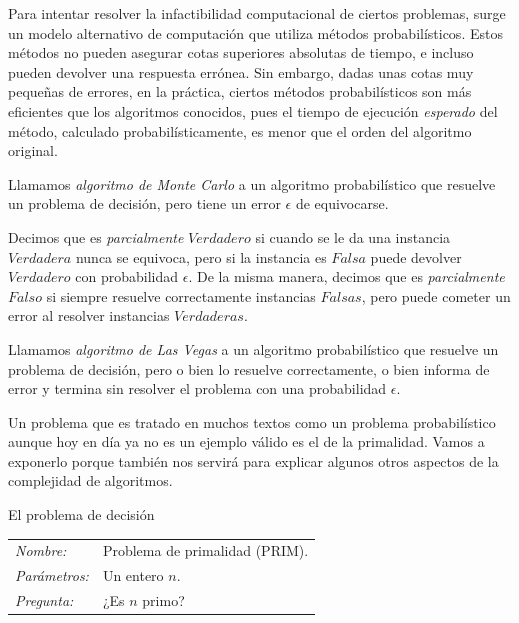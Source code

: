 Para intentar resolver la infactibilidad computacional de ciertos problemas, surge un modelo alternativo de computación que utiliza métodos probabilísticos. Estos métodos no pueden asegurar cotas superiores absolutas de tiempo, e incluso pueden devolver una respuesta errónea. Sin embargo, dadas unas cotas muy pequeñas de errores, en la práctica, ciertos métodos probabilísticos son más eficientes que los algoritmos conocidos, pues el tiempo de ejecución \textit{esperado} del método, calculado probabilísticamente, es menor que el orden del algoritmo original.



\begin{definition}
	Llamamos \textit{algoritmo de Monte Carlo} a un algoritmo probabilístico que resuelve un problema de decisión, pero tiene un error $\epsilon$ de equivocarse.

	Decimos que es \textit{parcialmente} $Verdadero$ si cuando se le da una instancia $Verdadera$ nunca se equivoca, pero si la instancia es $Falsa$ puede devolver $Verdadero$ con probabilidad $\epsilon$. De la misma manera, decimos que es \textit{parcialmente} $Falso$ si siempre resuelve correctamente instancias $Falsas$, pero puede cometer un error al resolver instancias $Verdaderas$.
\end{definition}


\begin{definition}
	Llamamos \textit{algoritmo de Las Vegas} a un algoritmo probabilístico que resuelve un problema de decisión, pero o bien lo resuelve correctamente, o bien informa de error y termina sin resolver el problema con una probabilidad $\epsilon$.
\end{definition}

Un problema que es tratado en muchos textos como un problema probabil\'istico aunque hoy en d\'ia ya no es un ejemplo v\'alido es el de la primalidad. Vamos a exponerlo porque tambi\'en nos servir\'a para explicar algunos otros aspectos de la complejidad de algoritmos.

\begin{example}
	El problema de decisión

	\begin{tabular}{|ll}
		\textit{Nombre:} & Problema de primalidad (PRIM). \\
		\textit{Parámetros:} & Un entero $n$. \\
		\textit{Pregunta:} & ¿Es $n$ primo? \\
	\end{tabular}
	\\
	\hfil
\end{example}

